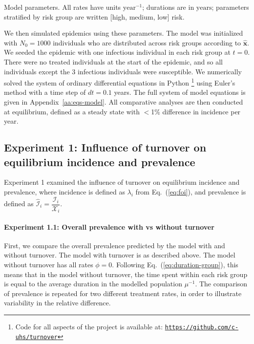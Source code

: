 \begin{table}
  \centering
  \caption{Model parameters.
    All rates have units $\mathrm{year}^{-1}$; durations are in $\mathrm{years}$;
    parameters stratified by risk group are written [high, medium, low] risk.}
  \label{tab:params}
  
\end{table}
\par
We then simulated epidemics using these parameters.
The model was initialized with $N_0 = 1000$ individuals
who are distributed across risk groups according to $\bm{\hat{x}}$.
We seeded the epidemic with
one infectious individual in each risk group at $t = 0$.
There were no treated individuals at the start of the epidemic,
and so all individuals except the 3 infectious individuals were susceptible.
We numerically solved the system of ordinary differential equations
in Python%
\footnote{Code for all aspects of the project is available at:
  \href{https://github.com/c-uhs/turnover}{\texttt{https://github.com/c-uhs/turnover}}}
using Euler's method with a time step of $dt = 0.1$ years.
The full system of model equations is given in Appendix~\ref{aa:eqs-model}.
All comparative analyses are then conducted at equilibrium,
defined as a steady state with $<$1\% difference in incidence per year.
\subsection{Experiment 1: Influence of turnover on equilibrium incidence and prevalence}
\label{ss:exp-1}
Experiment 1 examined the influence of turnover on
equilibrium incidence and prevalence, where
incidence is defined as $\lambda_i$ from Eq.~(\ref{eq:foi}), and
prevalence is defined as $\hat{\mathcal{I}}_i = \dfrac{\mathcal{I}_i}{\mathcal{X}_i}$.
\paragraph{Experiment 1.1: Overall prevalence with vs without turnover}
\label{p:exp-turnover-simple}
First, we compare the overall prevalence predicted by the model with and without turnover.
The model with turnover is as described above.
The model without turnover has all rates $\phi = 0$.
Following Eq.~(\ref{eq:duration-group}),
this means that in the model without turnover,
the time spent within each risk group is equal to
the average duration in the modelled population $\mu^{-1}$.
The comparison of prevalence is repeated for two different treatment rates,
in order to illustrate variability in the relative difference.
